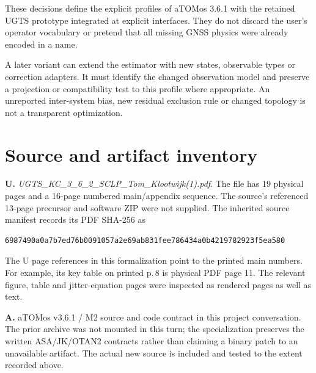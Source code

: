 These decisions define the explicit profiles of aTOMos 3.6.1 with the retained UGTS
prototype integrated at explicit interfaces. They do not discard the user's operator
vocabulary or pretend that all missing GNSS physics were already encoded in a name.

A later variant can extend the estimator with new states, observable types or correction
adapters. It must identify the changed observation model and preserve a projection or
compatibility test to this profile where appropriate. An unreported inter-system bias,
new residual exclusion rule or changed topology is not a transparent optimization.
\clearpage

\section{Source and artifact inventory}
\textbf{U.} \emph{UGTS\_KC\_3\_6\_2\_SCLP\_Tom\_Klootwijk(1).pdf}. The file has
19 physical pages and a 16-page numbered main/appendix sequence. The source's referenced
13-page precursor and software ZIP were not supplied. The inherited source manifest records its PDF SHA-256 as
\begin{lstlisting}
6987490a0a7b7ed76b0091057a2e69ab831fee786434a0b4219782923f5ea580
\end{lstlisting}
The U page references in this formalization point to the printed main numbers. For
example, its key table on printed p.\,8 is physical PDF page 11. The relevant figure,
table and jitter-equation pages were inspected as rendered pages as well as text.

\textbf{A.} aTOMos v3.6.1 / M2 source and code contract in this project conversation.
The prior archive was not mounted in this turn; the specialization preserves the
written ASA/JK/OTAN2 contracts rather than claiming a binary patch to an unavailable
artifact. The actual new source is included and tested to the extent recorded above.

